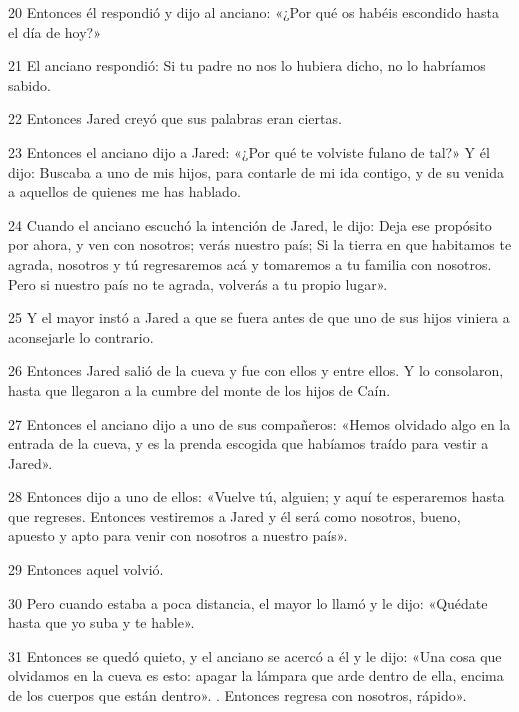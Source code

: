 \par 20 Entonces él respondió y dijo al anciano: «¿Por qué os habéis escondido hasta el día de hoy?»

\par 21 El anciano respondió: Si tu padre no nos lo hubiera dicho, no lo habríamos sabido.

\par 22 Entonces Jared creyó que sus palabras eran ciertas.

\par 23 Entonces el anciano dijo a Jared: «¿Por qué te volviste fulano de tal?» Y él dijo: Buscaba a uno de mis hijos, para contarle de mi ida contigo, y de su venida a aquellos de quienes me has hablado.

\par 24 Cuando el anciano escuchó la intención de Jared, le dijo: Deja ese propósito por ahora, y ven con nosotros; verás nuestro país; Si la tierra en que habitamos te agrada, nosotros y tú regresaremos acá y tomaremos a tu familia con nosotros. Pero si nuestro país no te agrada, volverás a tu propio lugar».

\par 25 Y el mayor instó a Jared a que se fuera antes de que uno de sus hijos viniera a aconsejarle lo contrario.

\par 26 Entonces Jared salió de la cueva y fue con ellos y entre ellos. Y lo consolaron, hasta que llegaron a la cumbre del monte de los hijos de Caín.

\par 27 Entonces el anciano dijo a uno de sus compañeros: «Hemos olvidado algo en la entrada de la cueva, y es la prenda escogida que habíamos traído para vestir a Jared».

\par 28 Entonces dijo a uno de ellos: «Vuelve tú, alguien; y aquí te esperaremos hasta que regreses. Entonces vestiremos a Jared y él será como nosotros, bueno, apuesto y apto para venir con nosotros a nuestro país».

\par 29 Entonces aquel volvió.

\par 30 Pero cuando estaba a poca distancia, el mayor lo llamó y le dijo: «Quédate hasta que yo suba y te hable».

\par 31 Entonces se quedó quieto, y el anciano se acercó a él y le dijo: «Una cosa que olvidamos en la cueva es esto: apagar la lámpara que arde dentro de ella, encima de los cuerpos que están dentro». . Entonces regresa con nosotros, rápido».

